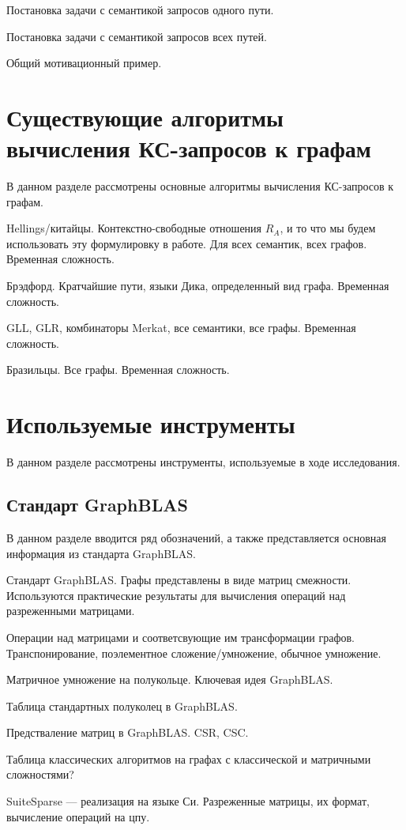 Постановка задачи с семантикой запросов одного пути.

Постановка задачи с семантикой запросов всех путей.

Общий мотивационный пример.

\section{Существующие алгоритмы вычисления КС-запросов к графам}\label{sec:ch1/sec4}
В данном разделе рассмотрены основные алгоритмы вычисления КС-запросов к графам.

Hellings/китайцы. Контекстно-свободные отношения $R_A$, и то что мы будем использовать эту формулировку в работе. Для всех семантик, всех графов. Временная сложность.

Брэдфорд. Кратчайшие пути, языки Дика, определенный вид графа. Временная сложность.

GLL, GLR, комбинаторы Merkat, все семантики, все графы. Временная сложность.

Бразильцы. Все графы. Временная сложность.

\section{Используемые инструменты}\label{sec:ch1/sec5}
В данном разделе рассмотрены инструменты, используемые в ходе исследования.

\subsection{Стандарт GraphBLAS}
В данном разделе вводится ряд обозначений, а также представляется основная информация из стандарта GraphBLAS.

Стандарт GraphBLAS. Графы представлены в виде матриц смежности. Используются практические результаты для вычисления операций над разреженными матрицами.

Операции над матрицами и соответсвующие им трансформации графов. Транспонирование, поэлементное сложение/умножение, обычное умножение.

Матричное умножение на полукольце. Ключевая идея GraphBLAS.

Таблица стандартных полуколец в GraphBLAS.

Предстваление матриц в GraphBLAS. CSR, CSC.

Таблица классических алгоритмов на графах с классической и матричными сложностями?

SuiteSparse --- реализация на языке Си. Разреженные матрицы, их формат, вычисление операций на цпу.

